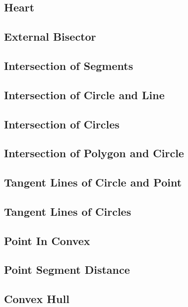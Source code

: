 \subsection{Heart}

\subsection{External Bisector}

\subsection{Intersection of Segments}

\subsection{Intersection of Circle and Line}

\subsection{Intersection of Circles}

\subsection{Intersection of Polygon and Circle}

\subsection{Tangent Lines of Circle and Point}

\subsection{Tangent Lines of Circles}

\subsection{Point In Convex}

\subsection{Point Segment Distance}

\subsection{Convex Hull}

